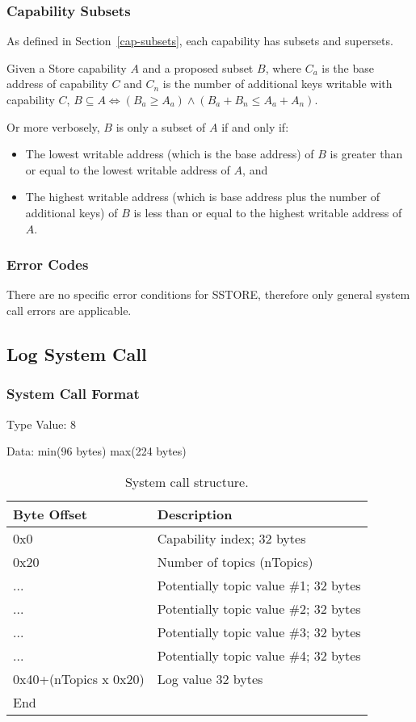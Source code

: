 \documentclass[english,a4paper]{article}
\let\oldparagraph\subsubsection
\renewcommand{\subsubsection}[1]{\oldparagraph{#1}\mbox{}}
\begin{document}
\subsubsection{Capability Subsets}
As defined in Section~\ref{cap-subsets}, each capability has subsets and
supersets.

Given a Store capability $A$ and a proposed subset $B$, where $C_a$ is the base
address of capability $C$ and $C_n$ is the number of additional keys writable
with capability $C$, $B \subseteq A \iff \left(B_a \geq A_a\right) \land
\left(B_a + B_n \leq A_a + A_n\right)$.

Or more verbosely, $B$ is only a subset of $A$ if and only if:
\begin{itemize}
  \item The lowest writable address (which is the base address) of $B$ is
  greater than or equal to the lowest writable address of $A$, and
  \item The highest writable address (which is base address plus the number of
  additional keys) of $B$ is less than or equal to the highest writable address
  of $A$.
\end{itemize}

\subsubsection{Error Codes}
There are no specific error conditions for SSTORE, therefore only general system
call errors are applicable.

\subsection{Log System Call}

\subsubsection{System Call Format}
Type Value: 8

Data: min(96 bytes) max(224 bytes)

\begin{table}[H]
  \caption{System call structure.}
  \centering{}%
  \begin{tabular}{l|p{}}
    \hline
    Byte Offset & Description\tabularnewline
    \hline
    \hline
    0x0 & Capability index; 32 bytes \tabularnewline
    0x20 & Number of topics (nTopics) \tabularnewline
    ... & Potentially topic value \#1; 32 bytes \tabularnewline
    ... & Potentially topic value \#2; 32 bytes \tabularnewline
    ... & Potentially topic value \#3; 32 bytes \tabularnewline
    ... & Potentially topic value \#4; 32 bytes \tabularnewline
    0x40+(nTopics x 0x20) & Log value 32 bytes \tabularnewline
    \hline
    End &  \tabularnewline
    \hline
  \end{tabular}
\end{table}
\end{document}
